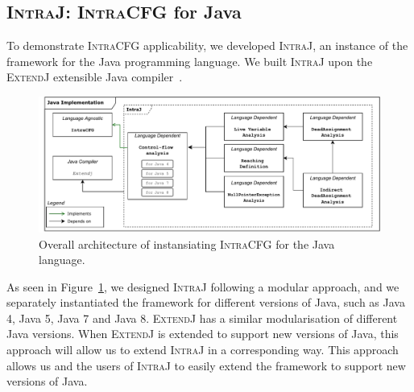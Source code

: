 \subsection{\textsc{IntraJ}: \textsc{IntraCFG} for Java}
\label{sec:IntraJ}
To demonstrate \textsc{IntraCFG} applicability, we developed
\textsc{IntraJ}, an instance of the framework for the Java programming language.
We built \textsc{IntraJ} upon the \textsc{ExtendJ} extensible Java compiler~\cite{DBLP:conf/oopsla/EkmanH07}.
\begin{figure}[H]
    \centering
    \includegraphics[scale=0.52]{kappa/img/architecturejava.pdf}
    \caption{\label{fig:intraJ} Overall architecture of instansiating \textsc{IntraCFG} for the Java language.}
\end{figure}

As seen in Figure~\ref{fig:intraJ}, we designed \textsc{IntraJ}
following a  modular approach, and we separately
instantiated the framework for different versions of Java, such as Java 4,
Java 5, Java 7 and Java 8.
\textsc{ExtendJ} has a similar modularisation of different Java versions. 
When \textsc{ExtendJ} is extended to support new versions of Java, this approach
will allow us to extend \textsc{IntraJ} in a corresponding way.
This approach allows us and the users of \textsc{IntraJ}
to easily extend the framework to support new versions of Java.

